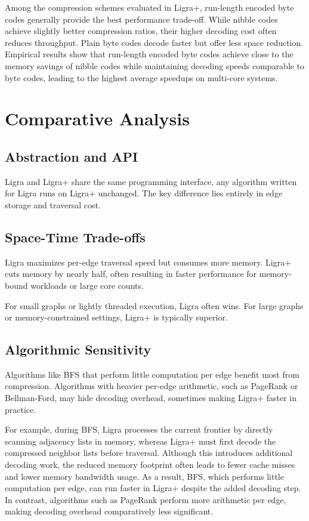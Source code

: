 \documentclass[a4paper,USenglish]{lipics-v2021}
\begin{document}
Among the compression schemes evaluated in Ligra+, run-length encoded byte codes generally provide the best performance trade-off. While nibble codes achieve slightly better compression ratios, their higher decoding cost often reduces throughput. Plain byte codes decode faster but offer less space reduction. Empirical results show that run-length encoded byte codes achieve close to the memory savings of nibble codes while maintaining decoding speeds comparable to byte codes, leading to the highest average speedups on multi-core systems.

\section{Comparative Analysis}

\subsection{Abstraction and API}
Ligra and Ligra+ share the same programming interface, any algorithm written for Ligra runs on Ligra+ unchanged. The key difference lies entirely in edge storage and traversal cost.

\subsection{Space-Time Trade-offs}
Ligra maximizes per-edge traversal speed but consumes more memory. Ligra+ cuts memory by nearly half, often resulting in faster performance for memory-bound workloads or large core counts.

For small graphs or lightly threaded execution, Ligra often wins. For large graphs or memory-constrained settings, Ligra+ is typically superior.

\subsection{Algorithmic Sensitivity}
Algorithms like BFS that perform little computation per edge benefit most from compression. Algorithms with heavier per-edge arithmetic, such as PageRank or Bellman-Ford, may hide decoding overhead, sometimes making Ligra+ faster in practice.

For example, during BFS, Ligra processes the current frontier by directly scanning adjacency lists in memory, whereas Ligra+ must first decode the compressed neighbor lists before traversal. Although this introduces additional decoding work, the reduced memory footprint often leads to fewer cache misses and lower memory bandwidth usage. As a result, BFS, which performs little computation per edge, can run faster in Ligra+ despite the added decoding step. In contrast, algorithms such as PageRank perform more arithmetic per edge, making decoding overhead comparatively less significant.
\end{document}
